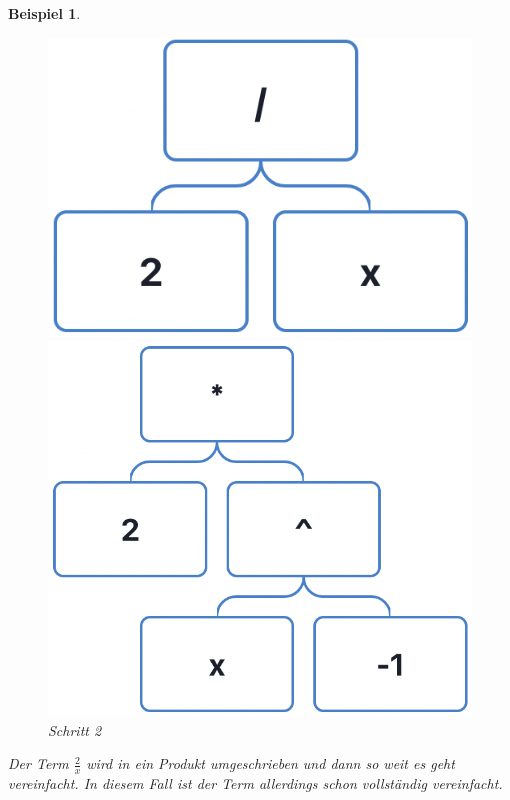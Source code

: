 \documentclass[11pt]{article}
\newtheorem{example}{Beispiel}
\begin{document}
\begin{example}
  \begin{figure}[h]
    \begin{minipage}{.5\textwidth}
      \centering
      \includegraphics[scale=0.4]{trees/division/beispiel_1_1.png}
      \caption{Schritt 1}
    \end{minipage}
    \begin{minipage}{.5\textwidth}
      \centering
      \includegraphics[scale=0.4]{trees/division/beispiel_1_2.png}
      \caption{Schritt 2}
    \end{minipage}
  \end{figure}
  Der Term $\frac{2}{x}$ wird in ein Produkt umgeschrieben und dann so weit es geht vereinfacht. In diesem Fall
  ist der Term allerdings schon vollständig vereinfacht.
\end{example}
\end{document}
